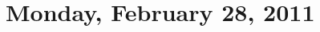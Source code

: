 \documentclass [letterpaper,11pt,twoside]{article}
\begin{document}
\setcounter {section}{10}\section {Monday, February 28, 2011}
\end{document}
